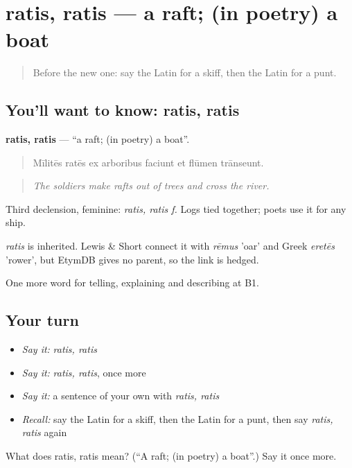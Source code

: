 \section[ratis, ratis]{ratis, ratis — a raft; (in poetry) a boat}

\label{lesson:LA-C435-ratis}



\begin{quote}
Before the new one: say the Latin for a skiff, then the Latin for a punt.
\end{quote}

\subsection*{You'll want to know: ratis, ratis}
\textbf{ratis, ratis} — \textquotedblleft{}a raft; (in poetry) a boat\textquotedblright{}.

\begin{quote}
Mīlitēs ratēs ex arboribus faciunt et flūmen trānseunt.
\end{quote}

\begin{quote}
\emph{The soldiers make rafts out of trees and cross the river.}
\end{quote}

Third declension, feminine: \emph{ratis, ratis f.} Logs tied together; poets use it for any ship.

\begin{cousinweb}
\emph{ratis} is inherited. Lewis \& Short connect it with \emph{rēmus} 'oar' and Greek \emph{eretēs} 'rower', but EtymDB gives no parent, so the link is hedged.
\end{cousinweb}

\begin{grammarlens}[title={What you've built}]
One more word for telling, explaining and describing at B1.
\end{grammarlens}

\subsection*{Your turn}
\begin{itemize}
\raggedright
  \item \emph{Say it:} \emph{ratis, ratis}
  \item \emph{Say it:} \emph{ratis, ratis}, once more
  \item \emph{Say it:} a sentence of your own with \emph{ratis, ratis}
  \item \emph{Recall:} say the Latin for a skiff, then the Latin for a punt, then say \emph{ratis, ratis} again
\end{itemize}

\begin{tcolorbox}[breakable,colback=teal!4,colframe=teal!35!black,title={Before you move on}]
What does ratis, ratis mean? (\textquotedblleft{}A raft; (in poetry) a boat\textquotedblright{}.) Say it once more.
\end{tcolorbox}
